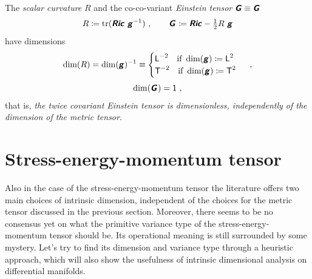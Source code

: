 \documentclass[\ifafour a4paper,12pt,\else a5paper,10pt,\fi%
onecolumn,oneside,article,%
british%
]{memoir}
\makeatletter
\theoremstyle{remark}
\theoremstyle{innote}
\newcommand*{\mathte}[1]{\textbf{\textit{\textsf{#1}}}}
\DeclareMathOperator{\tr}{tr}%
\newcommand*{\defd}{\coloneqq}
\renewcommand*{\|}[1][]{\nonscript\,#1\vert\nonscript\;\mathopen{}}
\newcommand*{\q}{}%
\DeclareRobustCommand*{\q}{%
  \mathord{\mathpalette\bigcdot@{}}%
}
\newcommand*{\bigcdot@scalefactor}{0.7}
\newcommand*{\bigcdot@widthfactor}{1.5}
\newcommand*{\bigcdot@}[2]{%
  \sbox0{$#1\vcenter{}$}%
  \sbox2{$#1\cdot\m@th$}%
  \hbox to \bigcdot@widthfactor\wd2{%
    \hfil
    \raise\ht0\hbox{%
      \scalebox{\bigcdot@scalefactor}{%
        \lower\ht0\hbox{$#1\bullet\m@th$}%
      }%
    }%
    \hfil
  }%
}
\newcommand*{\Un}{\textsf{1}}
\newcommand*{\Le}{\textsf{L}}
\newcommand*{\Ti}{\textsf{T}}
\newcommand*{\yg}{\mathte{g}}
\newcommand*{\yG}{\mathte{G}}
\newcommand*{\yRi}{\mathte{Ric}}
\newcommand*{\ysc}{R}
\renewcommand*{\i}{\indices}
\makeatother
\begin{document}
\medskip

The \emph{scalar curvature} $\ysc$ and the co-co-variant \emph{Einstein
  tensor} $\yG \equiv \yG\i{_{\q\q}}$
\begin{equation}
  \label{eq:curv_einst}
  \ysc \defd %
  \tr(\yRi\ \yg^{-1})
  \ ,
  \qquad
  \yG\i{_{\q\q}} \defd \yRi -%
  \tfrac{1}{2} \ysc\ \yg %
\end{equation}
have  dimensions
\begin{gather}
  \label{eq:dim_scalcurv}
  \dim(\ysc) = \dim(\yg)^{-1} \equiv
  \begin{cases}
    \Le^{-2}   \quad\text{if }\dim(\yg)\defd      \Le^2 \\
    \Ti^{-2}\quad\text{if }\dim(\yg)\defd      \Ti^2 \\
  \end{cases} \ ,
  \\[\jot]
  \label{eq:dim_einst}
  \dim(\yG\i{_{\q\q}}) = \Un \ ,
\end{gather}
that is, \emph{the twice covariant Einstein tensor is dimensionless,
  independently of the dimension of the metric tensor}.

\section{Stress-energy-momentum tensor}
\label{sec:stressenergy}

Also in the case of the stress-energy-momentum tensor the literature offers
two main choices of intrinsic dimension, independent of the choices for the
metric tensor discussed in the previous section. Moreover, there seems to
be no consensus yet on what the primitive variance type of the
stress-energy-momentum tensor should be. Its operational meaning is still
surrounded by some mystery. Let's try to find its dimension and variance
type through a heuristic approach, which will also show the usefulness of
intrinsic dimensional analysis on differential manifolds.
\end{document}
